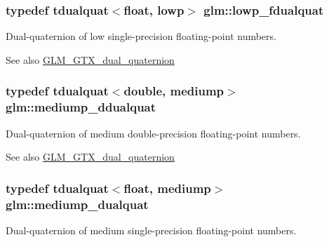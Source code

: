 \subsubsection[{lowp\+\_\+fdualquat}]{\setlength{\rightskip}{0pt plus 5cm}typedef tdualquat$<$float, lowp$>$ {\bf glm\+::lowp\+\_\+fdualquat}}\label{group__gtx__dual__quaternion_ga797f6d2679ab6773c1f057b97bf95111}
Dual-\/quaternion of low single-\/precision floating-\/point numbers.

\begin{DoxySeeAlso}{See also}
\hyperlink{group__gtx__dual__quaternion}{G\+L\+M\+\_\+\+G\+T\+X\+\_\+dual\+\_\+quaternion} 
\end{DoxySeeAlso}
\hypertarget{group__gtx__dual__quaternion_ga5727116ab20b2a1d40387766d723dd6c}{}
\subsubsection[{mediump\+\_\+ddualquat}]{\setlength{\rightskip}{0pt plus 5cm}typedef tdualquat$<$double, mediump$>$ {\bf glm\+::mediump\+\_\+ddualquat}}\label{group__gtx__dual__quaternion_ga5727116ab20b2a1d40387766d723dd6c}
Dual-\/quaternion of medium double-\/precision floating-\/point numbers.

\begin{DoxySeeAlso}{See also}
\hyperlink{group__gtx__dual__quaternion}{G\+L\+M\+\_\+\+G\+T\+X\+\_\+dual\+\_\+quaternion} 
\end{DoxySeeAlso}
\hypertarget{group__gtx__dual__quaternion_gaa88fe93eb823d1aba8d6df8028572cb5}{}
\subsubsection[{mediump\+\_\+dualquat}]{\setlength{\rightskip}{0pt plus 5cm}typedef tdualquat$<$float, mediump$>$ {\bf glm\+::mediump\+\_\+dualquat}}\label{group__gtx__dual__quaternion_gaa88fe93eb823d1aba8d6df8028572cb5}
Dual-\/quaternion of medium single-\/precision floating-\/point numbers.

